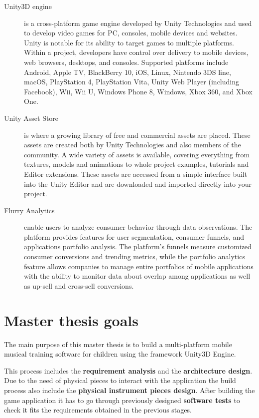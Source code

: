 \begin{description}

\item[Unity3D engine] is a cross-platform game engine developed by Unity Technologies and used to develop video games for PC, consoles, mobile devices and websites. Unity is notable for its ability to target games to multiple platforms. Within a project, developers have control over delivery to mobile devices, web browsers, desktops, and consoles. Supported platforms include Android, Apple TV, BlackBerry 10, iOS, Linux, Nintendo 3DS line, macOS, PlayStation 4, PlayStation Vita, Unity Web Player (including Facebook), Wii, Wii U, Windows Phone 8, Windows, Xbox 360, and Xbox One.~\cite{unitypress2}

\item[Unity Asset Store] is where a growing library of free and commercial assets are placed. These assets are created both by Unity Technologies and also members of the community. A wide variety of assets is available, covering everything from textures, models and animations to whole project examples, tutorials and Editor extensions. These assets are accessed from a simple interface built into the Unity Editor and are downloaded and imported directly into your project.

\item[Flurry Analytics] enable users to analyze consumer behavior through data observations. The platform provides features for user segmentation, consumer funnels, and applications portfolio analysis. The platform's funnels measure customized consumer conversions and trending metrics, while the portfolio analytics feature allows companies to manage entire portfolios of mobile applications with the ability to monitor data about overlap among applications as well as up-sell and cross-sell conversions.~\cite{flurry1}

\end{description}

\section{Master thesis goals}
\label{sec:masterthesisgoals}

The main purpose of this master thesis is to build a multi-platform mobile musical training software for children using the framework Unity3D Engine.

This process includes the \textbf{requirement analysis} and the \textbf{architecture design}. Due to the need of physical pieces to interact with the application the build process also include the \textbf{physical instrument pieces design}. After building the game application it has to go through previously designed \textbf{software tests} to check it fits the requirements obtained in the previous stages.

